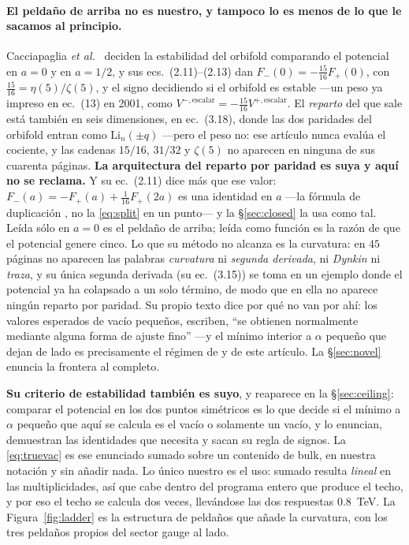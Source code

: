 \documentclass[11pt,a4paper]{article}
\begin{document}
\paragraph{El peldaño de arriba no es nuestro, y tampoco lo es menos de lo que le sacamos al
principio.} Cacciapaglia \emph{et al.}~\cite{CCD24} deciden la estabilidad del orbifold comparando
el potencial en $a=0$ y en $a=1/2$, y sus ecs.~(2.11)--(2.13) dan $F_-(0)=-\tfrac{15}{16}F_+(0)$,
con $\tfrac{15}{16}=\eta(5)/\zeta(5)$, y el signo decidiendo si el orbifold es estable ---un peso ya
impreso en \cite{PP01} ec.~(13) en 2001, como
$V^{-,\text{escalar}}=-\tfrac{15}{16}V^{+,\text{escalar}}$. El \emph{reparto} del que sale está
también en seis dimensiones, en \cite{GHBQ05} ec.~(3.18), donde las dos paridades del orbifold
entran como $\mathrm{Li}_n(\pm q)$ ---pero el peso no: ese artículo nunca evalúa el cociente, y las
cadenas $15/16$, $31/32$ y $\zeta(5)$ no aparecen en ninguna de sus cuarenta páginas. \textbf{La
arquitectura del reparto por paridad es suya y aquí no se reclama.} Y su ec.~(2.11) dice más que ese
valor: $F_-(a)=-F_+(a)+\tfrac1{16}F_+(2a)$ es una identidad en $a$ ---la fórmula de duplicación
\cite{Wood}, no la \eqref{eq:split} en un punto--- y la \S\ref{sec:closed} la usa como tal. Leída
sólo en $a=0$ es el peldaño de arriba; leída como función es la razón de que el potencial genere
cinco. Lo que su método no alcanza es
la curvatura: en $45$ páginas no aparecen las palabras \emph{curvatura} ni \emph{segunda derivada},
ni \emph{Dynkin} ni \emph{traza}, y su única segunda derivada (su ec.~(3.15)) se toma en un ejemplo
donde el potencial ya ha colapsado a un solo término, de modo que en ella no aparece ningún reparto
por paridad. Su propio texto dice por qué no van por ahí: los valores esperados de vacío pequeños,
escriben, ``se obtienen normalmente mediante alguna forma de ajuste fino'' ---y el mínimo interior a
$\alpha$ pequeño que dejan de lado es precisamente el régimen de \cite{KM25} y de este artículo. La
\S\ref{sec:novel} enuncia la frontera al completo.

\textbf{Su criterio de estabilidad también es suyo}, y reaparece en la \S\ref{sec:ceiling}: comparar
el potencial en los dos puntos simétricos es lo que decide si el mínimo a $\alpha$ pequeño que aquí
se calcula es el vacío o solamente un vacío, y \cite{CCD24} lo enuncian, demuestran las identidades
que necesita y sacan su regla de signos. La \eqref{eq:truevac} es ese enunciado sumado sobre un
contenido de bulk, en nuestra notación y sin añadir nada. Lo único nuestro es el uso: sumado resulta
\emph{lineal} en las multiplicidades, así que cabe dentro del programa entero que produce el techo,
y por eso el techo se calcula dos veces, llevándose las dos respuestas $0.8$~TeV.
La Figura~\ref{fig:ladder} es la estructura de
peldaños que añade la curvatura, con los tres peldaños propios del sector gauge al lado.
\end{document}
